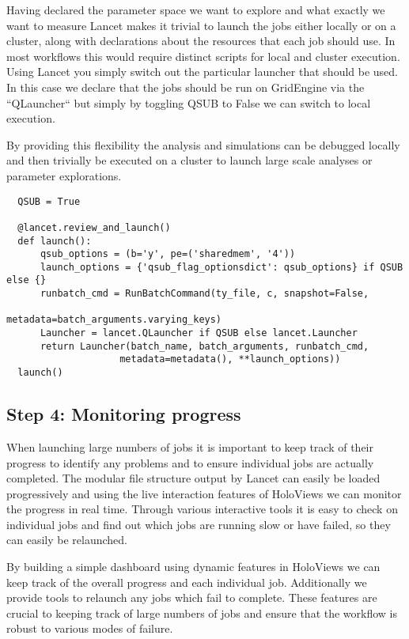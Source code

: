 Having declared the parameter space we want to explore and what
exactly we want to measure Lancet makes it trivial to launch the jobs
either locally or on a cluster, along with declarations about the
resources that each job should use. In most workflows this would
require distinct scripts for local and cluster execution. Using Lancet
you simply switch out the particular launcher that should be used. In
this case we declare that the jobs should be run on GridEngine via the
``QLauncher`` but simply by toggling QSUB to False we can switch to
local execution.

By providing this flexibility the analysis and simulations can be
debugged locally and then trivially be executed on a cluster to launch
large scale analyses or parameter explorations.

\begin{minipage}{\linewidth}
\begin{lstlisting}
  QSUB = True

  @lancet.review_and_launch()
  def launch():
      qsub_options = (b='y', pe=('sharedmem', '4'))
      launch_options = {'qsub_flag_optionsdict': qsub_options} if QSUB else {}
      runbatch_cmd = RunBatchCommand(ty_file, c, snapshot=False,
                                     metadata=batch_arguments.varying_keys)
      Launcher = lancet.QLauncher if QSUB else lancet.Launcher
      return Launcher(batch_name, batch_arguments, runbatch_cmd,
                    metadata=metadata(), **launch_options))
  launch()
\end{lstlisting}
\end{minipage}

\subsection{Step 4: Monitoring progress}

When launching large numbers of jobs it is important to keep track of
their progress to identify any problems and to ensure individual jobs
are actually completed. The modular file structure output by Lancet
can easily be loaded progressively and using the live interaction
features of HoloViews we can monitor the progress in real
time. Through various interactive tools it is easy to check on
individual jobs and find out which jobs are running slow or have
failed, so they can easily be relaunched.

By building a simple dashboard using dynamic features in HoloViews we
can keep track of the overall progress and each individual job.
Additionally we provide tools to relaunch any jobs which fail to
complete. These features are crucial to keeping track of large numbers
of jobs and ensure that the workflow is robust to various modes of
failure.

